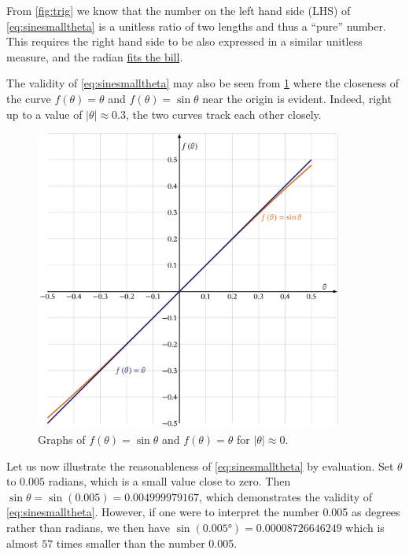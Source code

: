 \documentclass[
  a4paper,
]{article}
\begin{document}
From \cref{fig:trig} we know that the number on the left hand side (LHS)
of \cref{eq:sinesmalltheta} is a unitless ratio of two lengths and thus
a ``pure'' number. This requires the right hand side to be also
expressed in a similar unitless measure, and the radian
\href{https://www.collinsdictionary.com/dictionary/english/fit-the-bill}{fits
the bill}.

The validity of \cref{eq:sinesmalltheta} may also be seen from
\cref{fig:xsinx} where the closeness of the curve \(f(\theta) = \theta\)
and \(f(\theta) = \sin\theta\) near the origin is evident. Indeed, right
up to a value of \(\lvert\theta\rvert\approx 0.3\), the two curves track
each other closely.

\begin{figure}
\hypertarget{fig:xsinx}{%
\centering
\includegraphics[width=0.9\textwidth,height=\textheight]{images/xsinx.png}
\caption{Graphs of \(f(\theta)= \sin\theta\) and \(f(\theta) = \theta\)
for \(\lvert\theta\rvert\approx 0\).}\label{fig:xsinx}
}
\end{figure}

Let us now illustrate the reasonableness of \cref{eq:sinesmalltheta} by
evaluation. Set \(\theta\) to \(0.005\) radians, which is a small value
close to zero. Then \(\sin\theta = \sin(0.005) = 0.004999979167\), which
demonstrates the validity of \cref{eq:sinesmalltheta}. However, if one
were to interpret the number 0.005 as degrees rather than radians, we
then have \(\sin(0.005°) = 0.00008726646249\) which is almost \(57\)
times smaller than the number 0.005.
\end{document}
